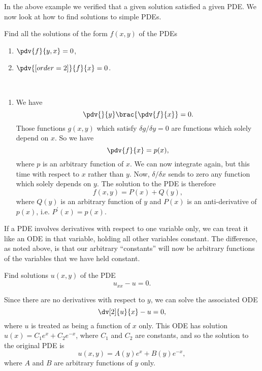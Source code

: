In the above example we verified that a given solution satisfied a given PDE. We now look at how to find solutions to simple PDEs.

\begin{exercise}
Find all the solutions of the form $f(x,y)$ of the PDEs
\begin{enumerate}[label=(\alph*)]
\item $\pdv{f}{y,x}=0$,
\item $\pdv{[order={2}]}{f}{x}=0$.
\end{enumerate}
\end{exercise}

\begin{solution} \
\begin{enumerate}[label=(\alph*)]
\item We have
\[ \pdv{}{y}\brac{\pdv{f}{x}}=0. \]
Those functions $g(x,y)$  which satisfy $\delta g/\delta y=0$ are functions which solely depend on $x$. So we have
\[ \pdv{f}{x}=p(x), \]
where $p$ is an arbitrary function of $x$. We can now integrate again, but this time with respect to $x$ rather than $y$. Now, $\delta/\delta x$ sends to zero any function which solely depends on $y$. The solution to the PDE is therefore
\[ f(x,y)=P(x)+Q(y), \]
where $Q(y)$ is an arbitrary function of $y$ and $P(x)$ is an anti-derivative of $p(x)$, i.e. $P^\prime(x)=p(x)$.
\end{enumerate}
\end{solution}

If a PDE involves derivatives with respect to one variable only, we can treat it like an ODE in that variable, holding all other variables constant. The difference, as noted above, is that our arbitrary ``constants'' will now be arbitrary functions of the variables that we have held constant.

\begin{exercise}
Find solutions $u(x,y)$ of the PDE
\[ u_{xx}-u=0. \]
\end{exercise}

\begin{solution}
Since there are no derivatives with respect to $y$, we can solve the associated ODE
\[ \dv[2]{u}{x}-u=0, \]
where $u$ is treated as being a function of $x$ only. This ODE has solution $u(x)=C_1e^x+C_2e^{-x}$, where $C_1$ and $C_2$ are constants, and so the solution to the original PDE is
\[ u(x,y)=A(y)e^x+B(y)e^{-x}, \]
where $A$ and $B$ are arbitrary functions of $y$ only.
\end{solution}


